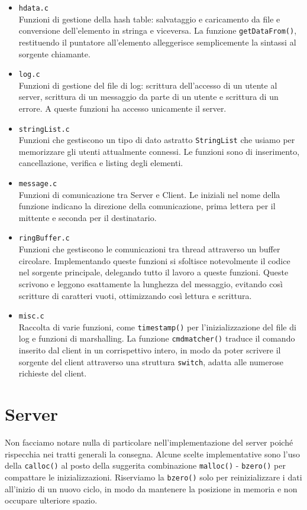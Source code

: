 \documentclass[a4paper, 11pt]{article} %
\begin{document}
\begin{itemize}
	\item \texttt{hdata.c}\\
	Funzioni di gestione della hash table: salvataggio e caricamento da file e conversione dell'elemento in stringa e viceversa. La funzione \texttt{getDataFrom()}, restituendo il puntatore all'elemento alleggerisce semplicemente la sintassi al sorgente chiamante.
	\item  \texttt{log.c}\\
	Funzioni di gestione del file di log: scrittura dell'accesso di un utente al server, scrittura di un messaggio da parte di un utente e scrittura di un errore. A queste funzioni ha accesso unicamente il server.
	\item  \texttt{stringList.c}\\
	Funzioni che gestiscono un tipo di dato astratto \texttt{StringList} che usiamo per memorizzare gli utenti attualmente connessi. Le funzioni sono di inserimento, cancellazione, verifica e listing degli elementi.
	\item  \texttt{message.c}\\
	Funzioni di comunicazione tra Server e Client. Le iniziali nel nome della funzione indicano la direzione della comunicazione, prima lettera per il mittente e seconda per il destinatario.
	\item  \texttt{ringBuffer.c}\\
	Funzioni che gestiscono le comunicazioni tra thread attraverso un buffer circolare. Implementando queste funzioni si sfoltisce notevolmente il codice nel sorgente principale, delegando tutto il lavoro a queste funzioni. Queste scrivono e leggono esattamente la lunghezza del messaggio, evitando così scritture di caratteri vuoti, ottimizzando così lettura e scrittura. 
	\item  \texttt{misc.c}\\
	Raccolta di varie funzioni, come \texttt{timestamp()} per l'inizializzazione del file di log e funzioni di marshalling. La funzione \texttt{cmdmatcher()} traduce il comando inserito dal client in un corrispettivo intero, in modo da poter scrivere il sorgente del client attraverso una struttura \texttt{switch}, adatta alle numerose richieste del client.
\end{itemize}

\section*{Server}
Non facciamo notare nulla di particolare nell'implementazione del server poiché rispecchia nei tratti generali la consegna. Alcune scelte implementative sono l'uso della \texttt{calloc()} al posto della suggerita combinazione \texttt{malloc()} - \texttt{bzero()} per compattare le inizializzazioni. Riserviamo la \texttt{bzero()} solo per reinizializzare i dati all'inizio di un nuovo ciclo, in modo da mantenere la posizione in memoria e non occupare ulteriore spazio.
\end{document}

